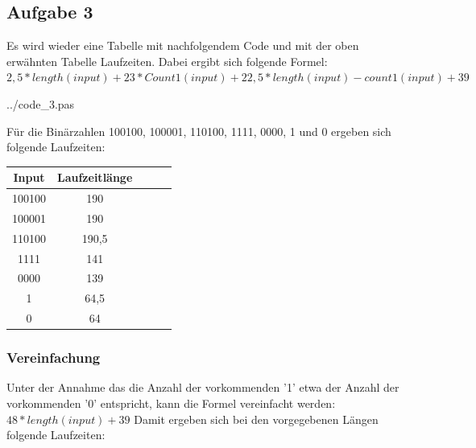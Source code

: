 \newpage
\subsection*{Aufgabe 3}
Es wird wieder eine Tabelle mit nachfolgendem Code und mit der oben erwähnten Tabelle Laufzeiten. Dabei ergibt sich folgende Formel: $2,5 * length(input) + 23 * Count1(input) + 22,5 * length(input) - count1(input) + 39$
\newline
\newline

 {../code_3.pas}

Für die Binärzahlen 100100, 100001, 110100, 1111, 0000, 1 und 0 ergeben sich folgende Laufzeiten:

\begin{center}
\begin{tabular}{|c|c|c|c|c|}
\hline
Input    & Laufzeitlänge \\ \hline 
100100   & 190 	\\ \hline 
100001   & 190	\\ \hline 
110100   & 190,5 	\\ \hline 
1111     & 141	\\ \hline 
0000	 & 139	\\ \hline 
1 	     & 64,5	\\ \hline 
0 	     & 64	\\ \hline 
\end{tabular}
\end{center}
\raggedright

\subsubsection*{Vereinfachung}
Unter der Annahme das die Anzahl der vorkommenden '1' etwa der Anzahl der vorkommenden '0' entspricht, kann die Formel vereinfacht werden: $48 * length(input) + 39$
\newpage
Damit ergeben sich bei den vorgegebenen Längen folgende Laufzeiten:

